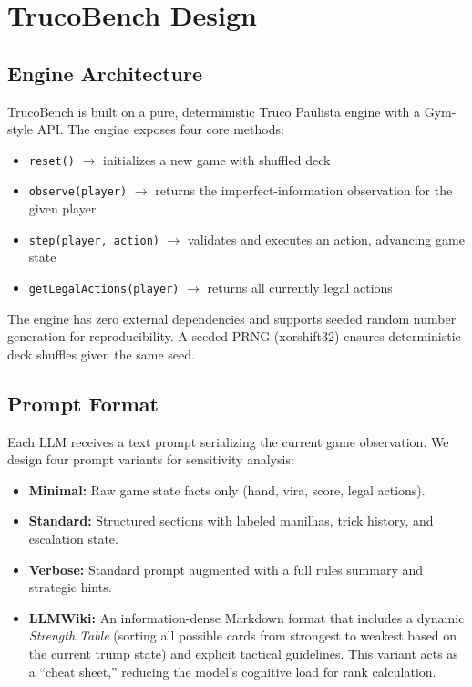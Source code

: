 \section{TrucoBench Design}

\subsection{Engine Architecture}

TrucoBench is built on a pure, deterministic Truco Paulista engine with a Gym-style API. The engine exposes four core methods:

\begin{itemize}
    \item \texttt{reset()} $\to$ initializes a new game with shuffled deck
    \item \texttt{observe(player)} $\to$ returns the imperfect-information observation for the given player
    \item \texttt{step(player, action)} $\to$ validates and executes an action, advancing game state
    \item \texttt{getLegalActions(player)} $\to$ returns all currently legal actions
\end{itemize}

The engine has zero external dependencies and supports seeded random number generation for reproducibility. A seeded PRNG (xorshift32) ensures deterministic deck shuffles given the same seed.

\subsection{Prompt Format}

Each LLM receives a text prompt serializing the current game observation. We design four prompt variants for sensitivity analysis:

\begin{itemize}
    \item \textbf{Minimal:} Raw game state facts only (hand, vira, score, legal actions).
    \item \textbf{Standard:} Structured sections with labeled manilhas, trick history, and escalation state.
    \item \textbf{Verbose:} Standard prompt augmented with a full rules summary and strategic hints.
    \item \textbf{LLMWiki:} An information-dense Markdown format that includes a dynamic \textit{Strength Table} (sorting all possible cards from strongest to weakest based on the current trump state) and explicit tactical guidelines. This variant acts as a ``cheat sheet,'' reducing the model's cognitive load for rank calculation.
\end{itemize}


